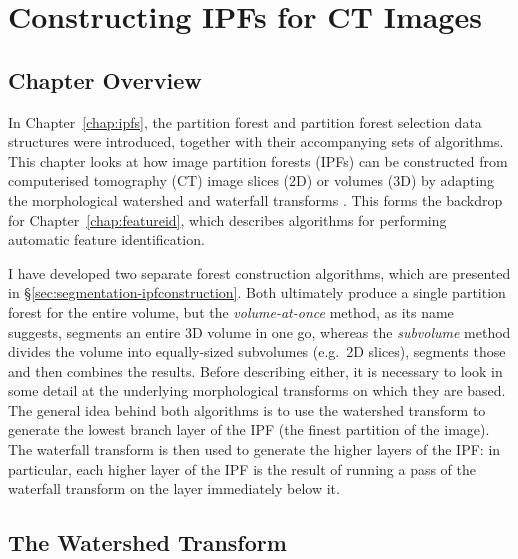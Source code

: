 \chapter{Constructing IPFs for CT Images}
\label{chap:segmentation}

\section{Chapter Overview}

In Chapter~\ref{chap:ipfs}, the partition forest and partition forest selection data structures were introduced, together with their accompanying sets of algorithms. This chapter looks at how image partition forests (IPFs) can be constructed from computerised tomography (CT) image slices (2D) or volumes (3D) by adapting the morphological watershed and waterfall transforms \cite{beucher94,marcotegui05}. This forms the backdrop for Chapter~\ref{chap:featureid}, which describes algorithms for performing automatic feature identification.

I have developed two separate forest construction algorithms, which are presented in \S\ref{sec:segmentation-ipfconstruction}. Both ultimately produce a single partition forest for the entire volume, but the \emph{volume-at-once} method, as its name suggests, segments an entire 3D volume in one go, whereas the \emph{subvolume} method divides the volume into equally-sized subvolumes (e.g.~2D slices), segments those and then combines the results. Before describing either, it is necessary to look in some detail at the underlying morphological transforms on which they are based. The general idea behind both algorithms is to use the watershed transform to generate the lowest branch layer of the IPF (the finest partition of the image). The waterfall transform is then used to generate the higher layers of the IPF: in particular, each higher layer of the IPF is the result of running a pass of the waterfall transform on the layer immediately below it.

\section{The Watershed Transform}
\label{sec:segmentation-watershed}

